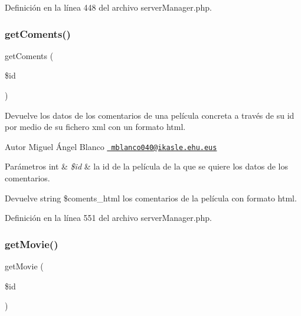 Definición en la línea 448 del archivo server\+Manager.\+php.

\mbox{\label{server_manager_8php_a165bd4fb886e760759845a26ed7d1c2f}} 
\subsubsection{\texorpdfstring{getComents()}{getComents()}}
{\footnotesize\ttfamily get\+Coments (\begin{DoxyParamCaption}\item[{}]{\$id }\end{DoxyParamCaption})}

Devuelve los datos de los comentarios de una película concreta a través de su id por medio de su fichero xml con un formato html.

\begin{DoxyAuthor}{Autor}
Miguel Ángel Blanco \href{mailto:mblanco040@ikasle.ehu.eus}{\texttt{ mblanco040@ikasle.\+ehu.\+eus}}
\end{DoxyAuthor}

\begin{DoxyParams}[1]{Parámetros}
int & {\em \$id} & la id de la película de la que se quiere los datos de los comentarios.\\
\hline
\end{DoxyParams}
\begin{DoxyReturn}{Devuelve}
string \$coments\+\_\+html los comentarios de la película con formato html. 
\end{DoxyReturn}


Definición en la línea 551 del archivo server\+Manager.\+php.

\mbox{\label{server_manager_8php_a7b9eed7e71146a4086047f9eaaf59985}} 
\subsubsection{\texorpdfstring{getMovie()}{getMovie()}}
{\footnotesize\ttfamily get\+Movie (\begin{DoxyParamCaption}\item[{}]{\$id }\end{DoxyParamCaption})}

